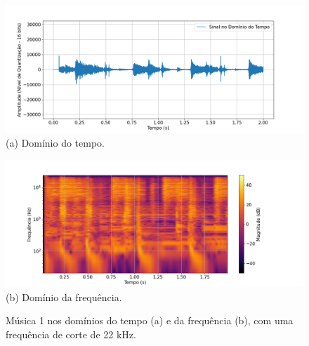 \begin{figure}[htpb]
    \centering
    \begin{minipage}[b]{0.7\textwidth}
        \centering
        \includegraphics[width=\textwidth]{figuras/fig30.png}
        \vspace{0.3cm} %
        (a) Domínio do tempo.
    \end{minipage}
    \hspace{0.5cm} %

    \begin{minipage}[b]{0.7\textwidth}
        \centering
        \includegraphics[width=\textwidth]{figuras/fig31.png}
        \vspace{0.3cm} %
        (b) Domínio da frequência.
    \end{minipage}

    \caption{Música 1 nos domínios do tempo (a) e da frequência (b), com uma frequência de corte de 22 kHz.}
    \label{fig30}
\end{figure}



